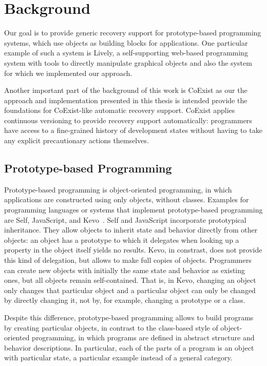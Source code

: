 \chapter{Background} \label{chapter:BACKGROUND}

Our goal is to provide generic recovery support for prototype-based programming systems, which use objects as building blocks for applications.
One particular example of such a system is Lively, a self-supporting web-based programming system with tools to directly manipulate graphical objects and also the system for which we implemented our approach.

Another important part of the background of this work is CoExist as our the approach and implementation presented in this thesis is intended provide the foundations for CoExist-like automatic recovery support.
CoExist applies continuous versioning to provide recovery support automatically: programmers have access to a fine-grained history of development states without having to take any explicit precautionary actions themselves.


\section{Prototype-based Programming}

Prototype-based programming is object-oriented programming, in which applications are constructed using only objects, without classes.
Examples for programming languages or systems that implement prototype-based programming are Self, JavaScript, and Kevo~\cite{Taivalsaari1992Kevo}.
Self and JavaScript incorporate prototypical inheritance.
They allow objects to inherit state and behavior directly from other objects: an object has a prototype to which it delegates when looking up a property in the object itself yields no results.
Kevo, in constrast, does not provide this kind of delegation, but allows to make full copies of objects.
Programmers can create new objects with initially the same state and behavior as existing ones, but all objects remain self-contained.
That is, in Kevo, changing an object only changes that particular object and a particular object can only be changed by directly changing it, not by, for example, changing a prototype or a class.

Despite this difference, prototype-based programming allows to build programs by creating particular objects, in contrast to the class-based style of object-oriented programming, in which programs are defined in abstract structure and behavior descriptions.
In particular, each of the parts of a program is an object with particular state, a particular example instead of a general category.

